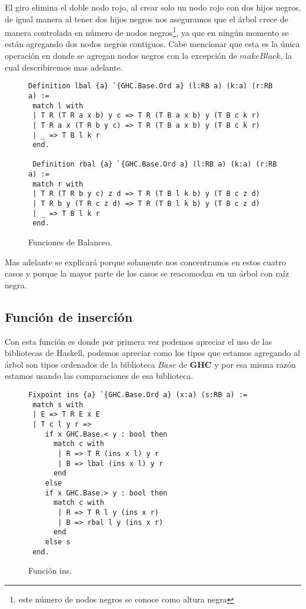El giro elimina el doble nodo rojo, al crear solo un nodo rojo con dos hijos negros, de igual
manera al tener dos hijos negros nos aseguramos que el árbol crece de manera controlada en
n\'umero de nodos negros\footnote{este n\'umero de nodos negros se conoce como altura negra}, ya
que en ningún momento se están agregando dos nodos negros contiguos. Cabe mencionar que esta es la
única operación en donde se agregan nodos negros con la excepción de $makeBlack$, la cual
describiremos mas adelante.
\begin{figure}
\centering
\captionsetup{justification=centering}
\begin{verbatim}
Definition lbal {a} `{GHC.Base.Ord a} (l:RB a) (k:a) (r:RB a) :=
 match l with
 | T R (T R a x b) y c => T R (T B a x b) y (T B c k r)
 | T R a x (T R b y c) => T R (T B a x b) y (T B c k r)
 | _ => T B l k r
 end.

 Definition rbal {a} `{GHC.Base.Ord a} (l:RB a) (k:a) (r:RB a) :=
 match r with
 | T R (T R b y c) z d => T R (T B l k b) y (T B c z d)
 | T R b y (T R c z d) => T R (T B l k b) y (T B c z d)
 | _ => T B l k r
 end.
\end{verbatim}
\caption{Funciones de Balanceo.}
\end{figure}

Mas adelante se explicar\'a porque solamente nos concentramos en estos cuatro casos y porque la
mayor parte de los casos se reacomodan en un \'arbol con ra\'iz negra.

\subsection {Funci\'on de inserci\'on}
Con esta funci\'on es donde por primera vez podemos apreciar el uso de las  bibliotecas de
Haskell, podemos apreciar como los tipos que estamos agregando al \'arbol son tipos ordenados de
la biblioteca $Base$ de \textbf{GHC} y por esa misma raz\'on estamos usando las comparaciones de
esa biblioteca.
\begin{figure}
\centering
\captionsetup{justification=centering}
\begin{verbatim}
Fixpoint ins {a} `{GHC.Base.Ord a} (x:a) (s:RB a) :=
 match s with
 | E => T R E x E
 | T c l y r =>
    if x GHC.Base.< y : bool then
      match c with
       | R => T R (ins x l) y r
       | B => lbal (ins x l) y r
      end
    else
    if x GHC.Base.> y : bool then
      match c with
       | R => T R l y (ins x r)
       | B => rbal l y (ins x r)
      end
    else s
 end.
\end{verbatim}
\caption{Funci\'on ins.}
\end{figure}

